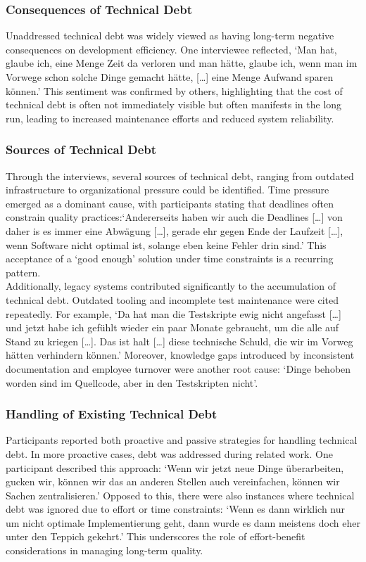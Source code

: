 \subsubsection{Consequences of Technical Debt}
Unaddressed technical debt was widely viewed as having long-term negative consequences on development efficiency. One interviewee reflected, `Man hat, glaube ich, eine Menge Zeit da verloren und man hätte, glaube ich, wenn man im Vorwege schon solche Dinge gemacht hätte, [\ldots] eine Menge Aufwand sparen können.'
This sentiment was confirmed by others, highlighting that the cost of technical debt is often not immediately visible but often manifests in the long run, leading to increased maintenance efforts and reduced system reliability.\\

\subsubsection{Sources of Technical Debt}
Through the interviews, several sources of technical debt, ranging from outdated infrastructure to organizational pressure could be identified. Time pressure emerged as a dominant cause, with participants stating that deadlines often constrain quality practices:`Andererseits haben wir auch die Deadlines [\ldots] von daher is es immer eine Abwägung
[\ldots], gerade ehr gegen Ende der Laufzeit [\ldots], wenn Software nicht optimal ist, solange eben keine Fehler drin sind.' This acceptance of a `good enough' solution under time constraints is a recurring pattern.\\

Additionally, legacy systems contributed significantly to the accumulation of technical debt. Outdated tooling and incomplete test maintenance were cited repeatedly. For example, `Da hat man die Testskripte ewig nicht angefasst [\ldots] und jetzt habe ich gefühlt wieder ein paar Monate gebraucht, um die alle auf Stand zu kriegen [\ldots].
Das ist halt [\ldots] diese technische Schuld, die wir im Vorweg hätten verhindern können.' Moreover, knowledge gaps introduced by inconsistent documentation and employee turnover were another root cause: `Dinge behoben worden sind im Quellcode, aber in den Testskripten nicht'.

\subsubsection{Handling of Existing Technical Debt}
Participants reported both proactive and passive strategies for handling technical debt. In more proactive cases, debt was addressed during related work. One participant described this approach: `Wenn wir jetzt neue Dinge überarbeiten, gucken wir, können wir das an anderen Stellen auch vereinfachen, können wir Sachen zentralisieren.'
Opposed to this, there were also instances where technical debt was ignored due to effort or time constraints: `Wenn es dann wirklich nur um nicht optimale Implementierung geht, dann wurde es dann meistens doch eher unter den Teppich gekehrt.'
This underscores the role of effort-benefit considerations in managing long-term quality.\\
